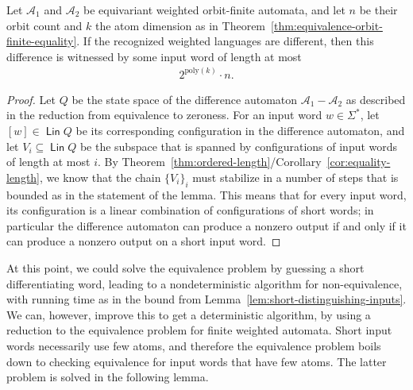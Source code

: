 \documentclass{theoretics}
\newcommand{\set}[1]{\{#1\}}
\newcommand{\Aa}{{\mathcal A}}
\DeclareMathOperator{\lin}{\mathsf{Lin}}
\newcommand{\poly}[1]{\mathrm{poly}(#1)}
\begin{document}
\begin{lemma}\label{lem:short-distinguishing-inputs}
    Let $\Aa_1$ and $\Aa_2$ be equivariant weighted orbit-finite automata, and let $n$ be their orbit count and $k$ the atom dimension as in Theorem~\ref{thm:equivalence-orbit-finite-equality}. If the recognized weighted languages are different, then this difference is witnessed by some input word of length at most 
    \begin{align*}
         2^{\poly k} \cdot n.
        \end{align*}
\end{lemma}
\begin{proof}
    Let $Q$ be the state space of the difference automaton $\Aa_1 - \Aa_2$ as described in the reduction from equivalence to zeroness. 
     For an input word $w \in \Sigma^*$, let $[w] \in \lin Q$ be its corresponding configuration in the difference automaton, and let $V_i \subseteq \lin Q$ be the subspace that is spanned by configurations of  input words of length at most $i$.   
    By Theorem~\ref{thm:ordered-length}/Corollary~\ref{cor:equality-length}, we know that the chain $\set{V_i}_i$  must stabilize in a number of steps that is bounded as in the statement of the lemma.  This means that for every input word, its  configuration  is a  linear combination of configurations of short words; in particular the difference automaton can produce a nonzero output if and only if it can produce a nonzero output on a short input word.
\end{proof}

At this point, we could solve the equivalence problem by  guessing a short differentiating word, leading to a nondeterministic algorithm for non-equivalence, with running time as in the bound from Lemma~\ref{lem:short-distinguishing-inputs}. 
We can, however, improve this to get a deterministic algorithm, by using a reduction to the equivalence problem for finite weighted automata. 
Short input words necessarily use few atoms, and therefore the equivalence problem boils down to checking equivalence for input words that have few atoms. The latter problem is solved in the following lemma.
\end{document}
